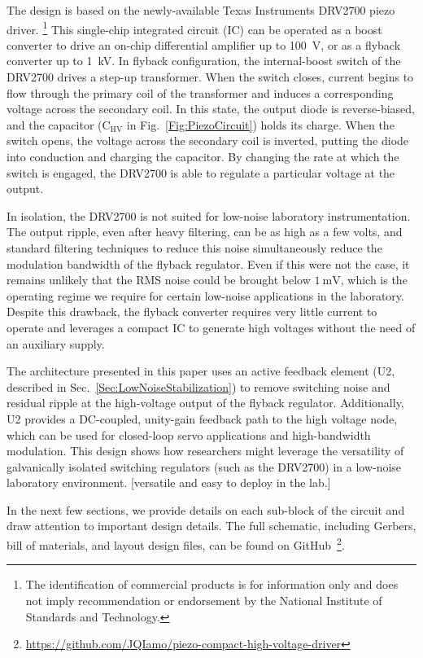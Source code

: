 \documentclass[aip,rsi,reprint]{revtex4-1} %
\begin{document}
The design is based on the newly-available Texas Instruments DRV2700 piezo driver.
\footnote{The identification of commercial products is for information only and does not imply recommendation or endorsement by the National Institute of Standards and Technology.}
This single-chip integrated circuit (IC) can be operated as a boost converter to drive an on-chip differential amplifier up to \SI{100}{\volt}, or as a flyback converter up to \SI{1}{\kilo\volt}.
In flyback configuration, the internal-boost switch of the DRV2700 drives a step-up transformer.
When the switch closes, current begins to flow through the primary coil of the transformer and induces a corresponding voltage across the secondary coil.
In this state, the output diode is reverse-biased, and the capacitor ($\text{C}_{\text{HV}}$ in Fig.~\ref{Fig:PiezoCircuit}) holds its charge.
When the switch opens, the voltage across the secondary coil is inverted, putting the diode into conduction and charging the capacitor.
By changing the rate at which the switch is engaged, the DRV2700 is able to regulate a particular voltage at the output.

In isolation, the DRV2700 is not suited for low-noise laboratory instrumentation. 
The output ripple, even after heavy filtering, can be as high as a few volts, and standard filtering techniques to reduce this noise simultaneously reduce the modulation bandwidth of the flyback regulator.
Even if this were not the case, it remains unlikely that the RMS noise could be brought below $\SI{1}{\milli\volt}$, which is the operating regime we require for certain low-noise applications in the laboratory.
Despite this drawback, the flyback converter requires very little current to operate and leverages a compact IC to generate high voltages without the need of an auxiliary supply.

The architecture presented in this paper uses an active feedback element (U2, described in Sec.~\ref{Sec:LowNoiseStabilization}) to remove switching noise and residual ripple at the high-voltage output of the flyback regulator.
Additionally, U2 provides a DC-coupled, unity-gain feedback path to the high voltage node, which can be used for closed-loop servo applications and high-bandwidth modulation.
This design shows how researchers might leverage the versatility of galvanically isolated switching regulators (such as the DRV2700) in a low-noise laboratory environment. [versatile and easy to deploy in the lab.]

In the next few sections, we provide details on each sub-block of the circuit and draw attention to important design details.
The full schematic, including Gerbers, bill of materials, and layout design files, can be found on GitHub~\footnote{\protect\url{https://github.com/JQIamo/piezo-compact-high-voltage-driver}}.
\end{document}
